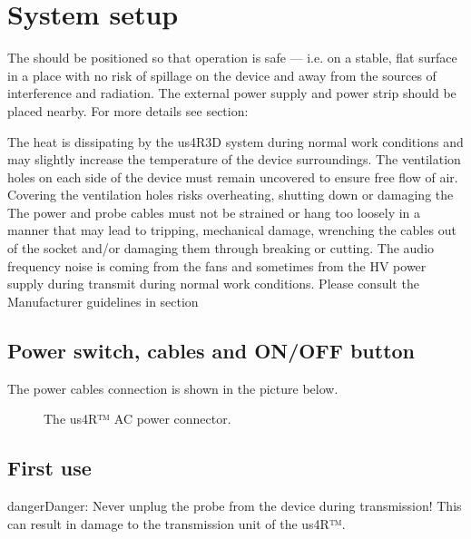 \documentclass[letterpaper,10pt,english]{sphinxmanual}
\begin{document}
\chapter{System setup}
\label{\detokenize{content/set-up:system-setup}}
\sphinxAtStartPar
The  should be positioned so that operation is safe — i.e. on
a stable, flat surface in a place with no risk of spillage on the device
and away from the sources of interference and radiation. The external
power supply and power strip should be placed nearby. For more details
see section: 

\sphinxAtStartPar
The heat is dissipating by the us4R\sphinxhyphen{}3D system during normal work
conditions and may slightly increase the temperature of the device
surroundings. The ventilation holes on each side of the device must
remain uncovered to ensure free flow of air. Covering the ventilation
holes risks overheating, shutting down or damaging the  The
power and probe cables must not be strained or hang too loosely in a
manner that may lead to tripping, mechanical damage, wrenching the
cables out of the socket and/or damaging them through breaking or
cutting. The audio frequency noise is coming from the fans and sometimes
from the HV power supply during transmit during normal work conditions.
Please consult the Manufacturer guidelines in section 


\section{Power switch, cables and ON/OFF button}
\label{\detokenize{content/set-up:power-switch-cables-and-on-off-button}}
\sphinxAtStartPar
The power cables connection is shown in the picture below.

\begin{figure}[htbp]
\centering
\capstart

\noindent{}
\caption{The us4R™ AC power connector.}\label{\detokenize{content/set-up:id2}}\end{figure}


\section{First use}
\label{\detokenize{content/set-up:first-use}}
\begin{sphinxadmonition}{danger}{Danger:}
\sphinxAtStartPar
Never unplug the probe from the device during transmission!
This can result in damage to the transmission unit of the us4R™.
\end{sphinxadmonition}
\end{document}

